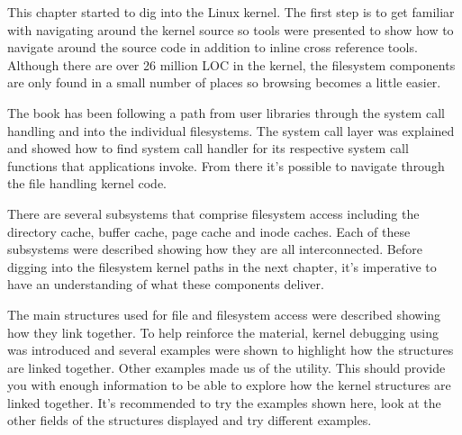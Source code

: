 This chapter started to dig into the Linux kernel. The first step is to get familiar with navigating around the kernel source so tools were presented to show how to navigate around the source code in addition to inline cross reference tools. Although there are over 26 million LOC in the kernel, the filesystem components are only found in a small number of places so browsing becomes a little easier.

The book has been following a path from user libraries through the system call handling and into the individual filesystems. The system call layer was explained and showed how to find system call handler for its respective system call functions that applications invoke. From there it's possible to navigate through the file handling kernel code.

There are several subsystems that comprise filesystem access including the directory cache, buffer cache, page cache and inode caches. Each of these subsystems were described showing how they are all interconnected. Before digging into the filesystem kernel paths in the next chapter, it's imperative to have an understanding of what these components deliver.

The main structures used for file and filesystem access were described showing how they link together. To help reinforce the material, kernel debugging using  was introduced and several examples were shown to highlight how the structures are linked together. Other examples made us of the  utility. This should provide you with enough information to be able to explore how the kernel structures are linked together. It's recommended to try the examples shown here, look at the other fields of the structures displayed and try different examples.



